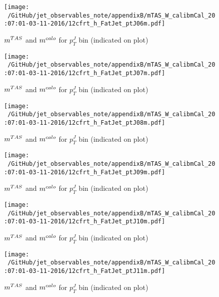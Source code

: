 \begin{figure}
 
\texttt{[image: ~/GitHub/jet\_observables\_note/appendixB/mTAS\_W\_calibmCal\_20:07:01-03-11-2016/12cfrt\_h\_FatJet\_ptJ06m.pdf]}
\caption{$m^{TAS}$ and $m^{calo}$ for $p_{T}^{J}$ bin (indicated on plot) }
 
\end{figure}
\begin{figure}
 
\texttt{[image: ~/GitHub/jet\_observables\_note/appendixB/mTAS\_W\_calibmCal\_20:07:01-03-11-2016/12cfrt\_h\_FatJet\_ptJ07m.pdf]}
\caption{$m^{TAS}$ and $m^{calo}$ for $p_{T}^{J}$ bin (indicated on plot) }
 
\end{figure}
 
\begin{figure}
 
\texttt{[image: ~/GitHub/jet\_observables\_note/appendixB/mTAS\_W\_calibmCal\_20:07:01-03-11-2016/12cfrt\_h\_FatJet\_ptJ08m.pdf]}
\caption{$m^{TAS}$ and $m^{calo}$ for $p_{T}^{J}$ bin (indicated on plot) }
 
\end{figure}
 
\begin{figure}
 
\texttt{[image: ~/GitHub/jet\_observables\_note/appendixB/mTAS\_W\_calibmCal\_20:07:01-03-11-2016/12cfrt\_h\_FatJet\_ptJ09m.pdf]}
\caption{$m^{TAS}$ and $m^{calo}$ for $p_{T}^{J}$ bin (indicated on plot) }
 
\end{figure}
 
\begin{figure}
 
\texttt{[image: ~/GitHub/jet\_observables\_note/appendixB/mTAS\_W\_calibmCal\_20:07:01-03-11-2016/12cfrt\_h\_FatJet\_ptJ10m.pdf]}
\caption{$m^{TAS}$ and $m^{calo}$ for $p_{T}^{J}$ bin (indicated on plot) }
 
\end{figure}
 
\begin{figure}
 
\texttt{[image: ~/GitHub/jet\_observables\_note/appendixB/mTAS\_W\_calibmCal\_20:07:01-03-11-2016/12cfrt\_h\_FatJet\_ptJ11m.pdf]}
\caption{$m^{TAS}$ and $m^{calo}$ for $p_{T}^{J}$ bin (indicated on plot) }
 
\end{figure}
 

